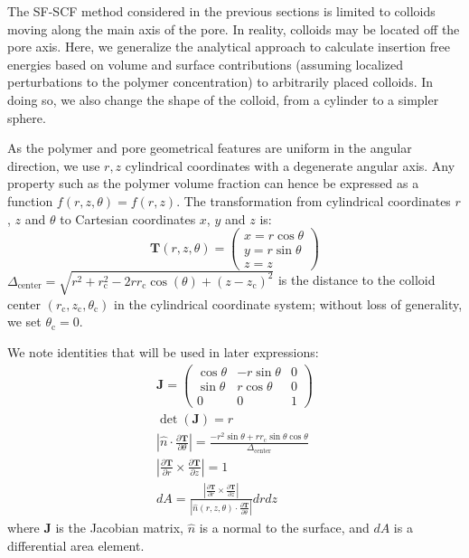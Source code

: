 \documentclass[10pt, a4paper]{article}
\begin{document}
\begin{multicols}{2}

The SF-SCF method considered in the previous sections is limited to colloids moving along the main axis of the pore.
In reality, colloids may be located off the pore axis.
Here, we generalize the analytical approach to calculate insertion free energies based on volume and surface contributions (assuming localized perturbations to the polymer concentration) to arbitrarily placed colloids.
In doing so, we also change the shape of the colloid, from a cylinder to a simpler sphere.

As the polymer and pore geometrical features are uniform in the angular direction, we use $r, z$ cylindrical coordinates with a degenerate angular axis.
Any property such as the polymer volume fraction can hence be expressed as a function $f(r,z,\theta) = f(r,z)$.
The transformation from cylindrical coordinates $r$, $z$ and $\theta$ to Cartesian coordinates $x$, $y$ and $z$ is:
\begin{equation}
    \bm{T}(r,z,\theta) = 
    \begin{pmatrix}
        x = r \cos \theta\\
        y = r \sin \theta\\
        z = z
    \end{pmatrix}
\end{equation}
$\Delta_{\text{center}} = \sqrt{r^2 + r_{\text{c}}^2 - 2 r r_{\text{c}} \cos(\theta) + (z - z_{\text{c}})^2}$ is the distance to the colloid center $(r_{\text{c}}, z_{\text{c}}, \theta_{\text{c}})$ in the cylindrical coordinate system; without loss of generality, we set $\theta_{\text{c}} = 0$.

We note identities that will be used in later expressions:
\begin{gather}
    \bm{J} = 
    \begin{pmatrix}
        \cos{\theta} & -r\sin\theta & 0 \\
        \sin{\theta} &  r\cos\theta & 0 \\
        0           & 0            & 1
    \end{pmatrix}\\
    \det(\bm{J}) = r \\
    \left| \hat{n} \cdot \frac{\partial \bm{T}}{\partial \theta} \right| = \frac{-r^2 \sin \theta + r r_{\text{c}} \sin \theta \cos \theta}{\Delta_{\text{center}}}\\
    \left| \frac{\partial \bm{T}}{\partial r} \times \frac{\partial \bm{T}}{\partial z} \right| = 1\\
    dA = \frac{\left|\frac{\partial \bm{T}}{\partial r} \times \frac{\partial \bm{T}}{\partial z} \right|}{\left|\hat{n}(r, z, \theta) \cdot \frac{\partial\bm{T}}{\partial \theta}\right|} dr dz
\end{gather}
where $\bm{J}$ is the Jacobian matrix, $\hat{n}$ is a normal to the surface, and $dA$ is a differential area element.


\end{multicols}
\end{document}
